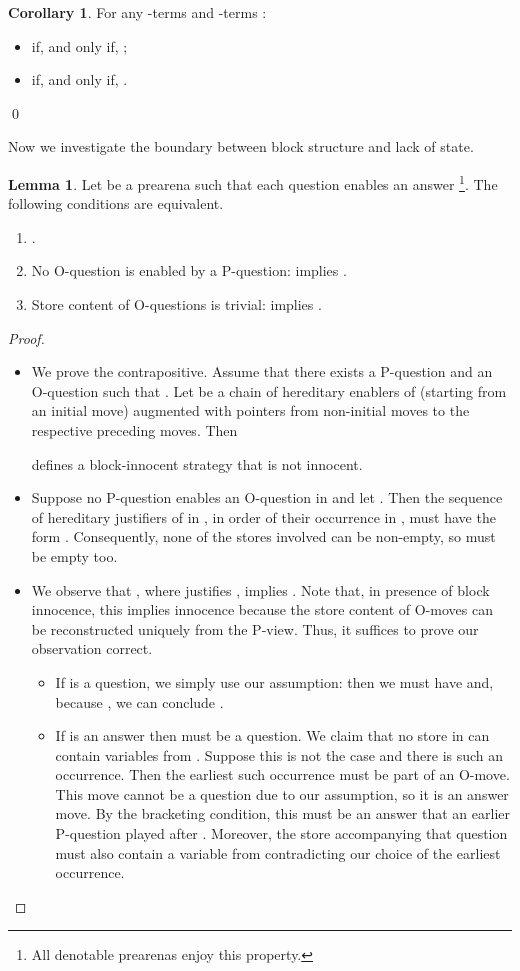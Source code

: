\documentclass{CSML}
\theoremstyle{definition}\newtheorem{definition}[thm]{Definition}
\theoremstyle{definition}\newtheorem{example}[thm]{Example}
\theoremstyle{definition}\newtheorem{proposition}[thm]{Proposition}
\theoremstyle{definition}\newtheorem{lemma}[thm]{Lemma}
\theoremstyle{definition}\newtheorem{theorem}[thm]{Theorem}
\theoremstyle{definition}\newtheorem{corollary}[thm]{Corollary}
\theoremstyle{definition}\newtheorem{remark}[thm]{Remark}
\newcommand\nt[1]{#1}
\begin{document}
\begin{corollary}\label{cor:conservativity}
For any -terms  and -terms :
\begin{itemize}
\item 
if, and only if, ;
\item 
if, and only if, .
\end{itemize}\qed
\end{corollary}
Now we investigate the boundary between block structure
and lack of state.
\begin{lemma}\label{lem:binno-inno}
Let  be a \nt{prearena} such that each question enables an answer
\footnote{All denotable \nt{prearenas} enjoy this property.}.
The following conditions are equivalent.
\begin{enumerate}
\item .
\item No O-question is enabled by a P-question:
 implies .
\item Store content of O-questions is trivial:
 implies .
\end{enumerate}
\end{lemma}
\begin{proof}\hfill
\begin{itemize}[label=]
\item[]  We prove the contrapositive. Assume 
that there exists a P-question  and an O-question  
such that .
Let  be a chain of hereditary enablers of  (starting from an initial move) 
augmented with pointers from non-initial moves to the respective preceding moves.
Then 


defines a block-innocent strategy that is not innocent.


\item[] Suppose no P-question enables an O-question in 
and let .
Then the sequence of hereditary justifiers of  in ,
in order of their occurrence in ,  must have the form .
Consequently, none of the stores involved can be non-empty, so 
must be empty too.
\item[]
We observe that
, where  justifies ,  
implies . Note that, in presence of block innocence, this
implies innocence because the store content of O-moves 
can be reconstructed uniquely from the P-view.
Thus, it suffices to prove our observation correct.
\begin{itemize}
\item If  is a question, we simply use our assumption: then we must have
 and, because , we can conclude
.
\item If  is an answer then  must be a question. We claim that 
no store in  can contain variables from .
Suppose this is not the case and there is such an occurrence.
Then the earliest such occurrence must be part of an O-move.
This move cannot be a question due to our assumption, so 
it is an answer move. By the bracketing condition, this must be an 
answer that an earlier P-question played after . Moreover, the store
accompanying that question must also contain a variable from 
contradicting our choice of the earliest occurrence.\qedhere
\end{itemize}
\end{itemize}
\end{proof}
\end{document}
